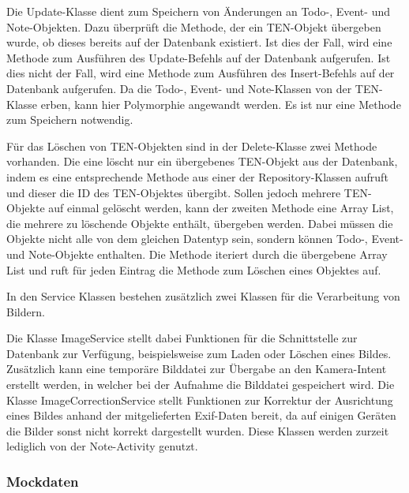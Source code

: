 Die Update-Klasse dient zum Speichern von Änderungen an Todo-, Event- und Note-Objekten. Dazu überprüft die Methode, der ein TEN-Objekt übergeben wurde, ob dieses bereits auf der Datenbank existiert. Ist dies der Fall, wird eine Methode zum Ausführen des Update-Befehls auf der Datenbank aufgerufen. Ist dies nicht der Fall, wird eine Methode zum Ausführen des Insert-Befehls auf der Datenbank aufgerufen. Da die Todo-, Event- und Note-Klassen von der TEN-Klasse erben, kann hier Polymorphie angewandt werden. Es ist nur eine Methode zum Speichern notwendig.

Für das Löschen von TEN-Objekten sind in der Delete-Klasse zwei Methode vorhanden. Die eine löscht nur ein übergebenes TEN-Objekt aus der Datenbank, indem es eine entsprechende Methode aus einer der Repository-Klassen aufruft und dieser die ID des TEN-Objektes übergibt. Sollen jedoch mehrere TEN-Objekte auf einmal gelöscht werden, kann der zweiten Methode eine Array List, die mehrere zu löschende Objekte enthält, übergeben werden. Dabei müssen die Objekte nicht alle von dem gleichen Datentyp sein, sondern können Todo-, Event- und Note-Objekte enthalten. Die Methode iteriert durch die übergebene Array List und ruft für jeden Eintrag die Methode zum Löschen eines Objektes auf.

In den Service Klassen bestehen zusätzlich zwei Klassen für die Verarbeitung von Bildern.

Die Klasse ImageService stellt dabei Funktionen für die Schnittstelle zur Datenbank zur Verfügung, beispielsweise zum Laden oder Löschen eines Bildes. Zusätzlich kann eine temporäre Bilddatei zur Übergabe an den Kamera-Intent erstellt werden, in welcher bei der Aufnahme die Bilddatei gespeichert wird. Die Klasse ImageCorrectionService stellt Funktionen zur Korrektur der Ausrichtung eines Bildes anhand der mitgelieferten Exif-Daten bereit, da auf einigen Geräten die Bilder sonst nicht korrekt dargestellt wurden. Diese Klassen werden zurzeit lediglich von der Note-Activity genutzt.

\subsubsection{Mockdaten}

